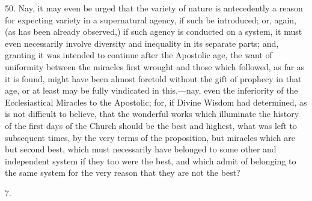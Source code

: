 50.
Nay, it may even be urged that the variety of nature is antecedently a
reason for expecting variety in a supernatural agency, if such be
introduced; or, again, (as has been already observed,) if such
agency is conducted on a system, it must even necessarily involve
diversity and inequality in its separate parts; and, granting it was
intended to continue after the Apostolic age, the want of uniformity
between the miracles first wrought and those which followed, as far as
it is found, might have been almost foretold without the gift of
prophecy in that age, or at least may be fully vindicated in
this,—nay, even the inferiority of the Ecclesiastical Miracles to
the Apostolic; for, if Divine Wisdom had determined, as is not
difficult to believe, that the wonderful works which illuminate the
history of the first days of the Church should be the best and
highest, what was left to subsequent times, by the very terms of the
proposition, but miracles which are but second best, which must
necessarily have belonged to some other and independent system if they
too were the best, and which admit of belonging to the same system for
the very reason that they are not the best?

7.

